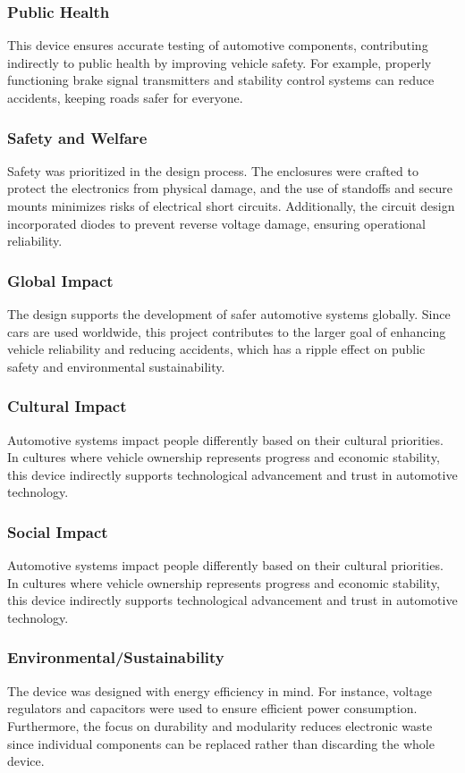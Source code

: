 \documentclass[12pt]{article}
\begin{document}
\subsubsection{Public Health}
This device ensures accurate testing of automotive components, contributing
indirectly to public health by improving vehicle safety. For example, properly
functioning brake signal transmitters and stability control systems can reduce
accidents, keeping roads safer for everyone.


\subsubsection{Safety and Welfare}
Safety was prioritized in the design process. The enclosures were crafted to
protect the electronics from physical damage, and the use of standoffs and
secure mounts minimizes risks of electrical short circuits. Additionally, the
circuit design incorporated diodes to prevent reverse voltage damage, ensuring
operational reliability.


\subsubsection{Global Impact}
The design supports the development of safer automotive systems globally. Since
cars are used worldwide, this project contributes to the larger goal of
enhancing vehicle reliability and reducing accidents, which has a ripple effect
on public safety and environmental sustainability.


\subsubsection{Cultural Impact}
Automotive systems impact people differently based on their cultural
priorities. In cultures where vehicle ownership represents progress and
economic stability, this device indirectly supports technological advancement
and trust in automotive technology.


\subsubsection{Social Impact}
Automotive systems impact people differently based on their cultural
priorities. In cultures where vehicle ownership represents progress and
economic stability, this device indirectly supports technological advancement
and trust in automotive technology.

\subsubsection{Environmental/Sustainability}
The device was designed with energy efficiency in mind. For instance, voltage
regulators and capacitors were used to ensure efficient power consumption.
Furthermore, the focus on durability and modularity reduces electronic waste
since individual components can be replaced rather than discarding the whole
device.
\end{document}
